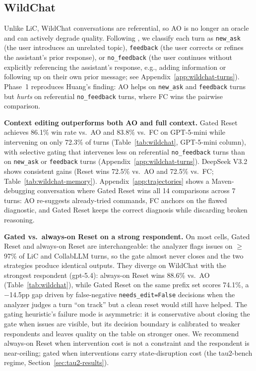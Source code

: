 \documentclass{article}
\begin{document}
\subsection{WildChat}
\label{sec:wildchat-results}

Unlike LiC, WildChat conversations are referential, so AO is no longer an oracle and can actively degrade quality. Following \citet{huang2026context}, we classify each turn as \texttt{new\_ask} (the user introduces an unrelated topic), \texttt{feedback} (the user corrects or refines the assistant's prior response), or \texttt{no\_feedback} (the user continues without explicitly referencing the assistant's response, e.g., adding information or following up on their own prior message; see Appendix~\ref{app:wildchat-turns}). Phase~1 reproduces Huang's finding: AO helps on \texttt{new\_ask} and \texttt{feedback} turns but \emph{hurts} on referential \texttt{no\_feedback} turns, where FC wins the pairwise comparison.

\noindent\textbf{Context editing outperforms both AO and full context.}
Gated Reset achieves 86.1\% win rate vs.\ AO and 83.8\% vs.\ FC on GPT-5-mini while intervening on only 72.3\% of turns (Table~\ref{tab:wildchat}, GPT-5-mini column), with selective gating that intervenes less on referential \texttt{no\_feedback} turns than on \texttt{new\_ask} or \texttt{feedback} turns (Appendix~\ref{app:wildchat-turns}). DeepSeek V3.2 shows consistent gains (Reset wins 72.5\% vs.\ AO and 72.5\% vs.\ FC; Table~\ref{tab:wildchat-memory}). Appendix~\ref{app:trajectories} shows a Maven-debugging conversation where Gated Reset wins all 14 comparisons across 7 turns: AO re-suggests already-tried commands, FC anchors on the flawed diagnostic, and Gated Reset keeps the correct diagnosis while discarding broken reasoning.

\noindent\textbf{Gated vs.\ always-on Reset on a strong respondent.}
On most cells, Gated Reset and always-on Reset are interchangeable: the analyzer flags issues on $\ge$97\% of LiC and CollabLLM turns, so the gate almost never closes and the two strategies produce identical outputs. They diverge on WildChat with the strongest respondent (gpt-5.4): always-on Reset wins 88.6\% vs.\ AO (Table~\ref{tab:wildchat}), while Gated Reset on the same prefix set scores 74.1\%, a $-$14.5pp gap driven by false-negative \texttt{needs\_edit=False} decisions when the analyzer judges a turn ``on track'' but a clean reset would still have helped. The gating heuristic's failure mode is asymmetric: it is conservative about closing the gate when issues are visible, but its decision boundary is calibrated to weaker respondents and leaves quality on the table on stronger ones. We recommend always-on Reset when intervention cost is not a constraint and the respondent is near-ceiling; gated when interventions carry state-disruption cost (the tau2-bench regime, Section~\ref{sec:tau2-results}).
\end{document}
